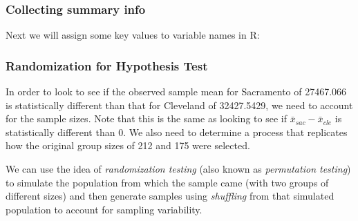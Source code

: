 \documentclass[]{tufte-book}
\newenvironment{Shaded}{\begin{snugshade}}{\end{snugshade}}
\newcommand{\DecValTok}[1]{\textcolor[rgb]{0.00,0.00,0.81}{{#1}}}
\newcommand{\StringTok}[1]{\textcolor[rgb]{0.31,0.60,0.02}{{#1}}}
\newcommand{\NormalTok}[1]{{#1}}
\begin{document}
\subsubsection{Collecting summary info}\label{collecting-summary-info-1}

Next we will assign some key values to variable names in R:

\begin{Shaded}
\end{Shaded}

\subsubsection{Randomization for Hypothesis
Test}\label{randomization-for-hypothesis-test-1}

In order to look to see if the observed sample mean for Sacramento of
27467.066 is statistically different than that for Cleveland of
32427.5429, we need to account for the sample sizes. Note that this is
the same as looking to see if \(\bar{x}_{sac} - \bar{x}_{cle}\) is
statistically different than 0. We also need to determine a process that
replicates how the original group sizes of 212 and 175 were selected.

We can use the idea of \emph{randomization testing} (also known as
\emph{permutation testing}) to simulate the population from which the
sample came (with two groups of different sizes) and then generate
samples using \emph{shuffling} from that simulated population to account
for sampling variability.
\end{document}
